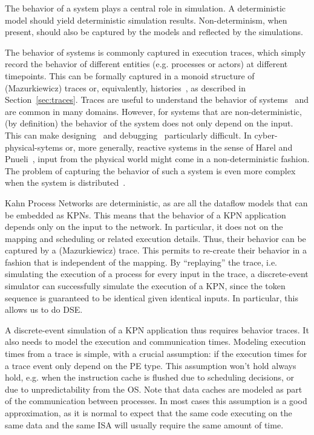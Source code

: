 The behavior of a system plays a central role in simulation. A deterministic model should yield deterministic simulation results.
Non-determinism, when present, should also be captured by the models and reflected by the simulations.

The behavior of systems is commonly captured in execution traces, which simply record the behavior of different entities (e.g. processes or actors) at different timepoints.
This can be formally captured in a monoid structure of (Mazurkiewicz) traces or, equivalently, histories~\cite{diekert1995book}, as described in Section~\ref{sec:traces}.
Traces are useful to understand the behavior of systems~\cite{vampir} and are common in many domains.
However, for systems that are non-deterministic, (by definition) the behavior of the system does not only depend on the input.
This can make designing~\cite{lee2006problem} and debugging~\cite{murillo_debugging} particularly difficult.
In cyber-physical-sytems or, more generally, reactive systems in the sense of Harel and Pnueli~\cite{harel_pnueli_reactive}, input from the physical world might come in a non-deterministic fashion.
The problem of capturing the behavior of such a system is even more complex when the system is distributed~\cite{shaver_phdthesis}. 

Kahn Process Networks are deterministic, as are all the dataflow models that can be embedded as KPNs.
This means that the behavior of a KPN application depends only on the input to the network.
In particular, it does not on the mapping and scheduling or related execution details.
Thus, their behavior can be captured by a (Mazurkiewicz) trace.
This permits to re-create their behavior in a fashion that is independent of the mapping.
By ``replaying'' the trace, i.e. simulating the execution of a process for every input in the trace, a discrete-event simulator can successfully simulate the execution of a KPN, since the token sequence is guaranteed to be identical given identical inputs.
In particular, this allows us to do \acf{DSE}.

A discrete-event simulation of a KPN application thus requires behavior traces. It also needs to model the execution and communication times.
Modeling execution times from a trace is simple, with a crucial assumption: if the execution times for a trace event only depend on the PE type.
This assumption won't hold always hold, e.g. when the instruction cache is flushed due to scheduling decisions, or due to unpredictability from the \ac{OS}.
Note that data caches are modeled as part of the communication between processes.
In most cases this assumption is a good approximation, as it is normal to expect that the same code executing on the same data and the same \ac{ISA} will usually require the same amount of time.

